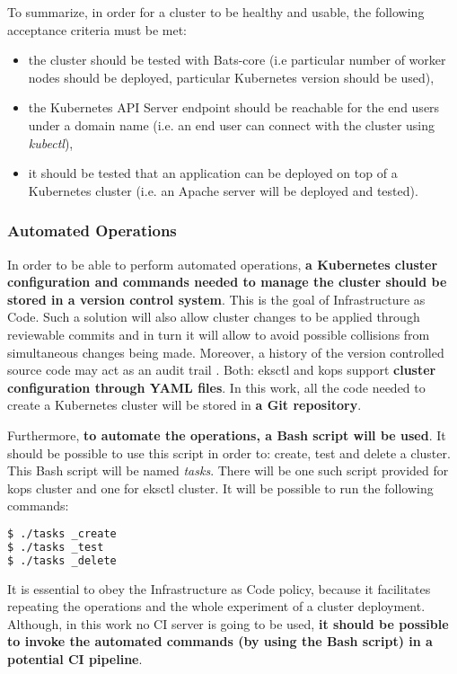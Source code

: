 To summarize, in order for a cluster to be healthy and usable, the following acceptance criteria must be met:
\begin{itemize}
\item the cluster should be tested with Bats-core (i.e particular number of worker nodes should be deployed, particular Kubernetes version should be used),
\item the Kubernetes API Server endpoint should be reachable for the end users under a domain name (i.e. an end user can connect with the cluster using \textit{kubectl}),
\item it should be tested that an application can be deployed on top of a Kubernetes cluster (i.e. an Apache server will be deployed and tested).
\end{itemize}

\subsubsection{Automated Operations}

In order to be able to perform automated operations, \textbf{a Kubernetes cluster configuration and commands needed to manage the cluster should be stored in a version control system}. This is the goal of Infrastructure as Code. Such a solution will also allow cluster changes to be applied through reviewable commits and in turn it will allow to avoid possible collisions from simultaneous changes being made. Moreover, a history of the version controlled source code may act as an audit trail \cite{online-kops-ci} \cite{online-kops-manifest}. Both: eksctl and kops support \textbf{cluster configuration through YAML files}. In this work, all the code needed to create a Kubernetes cluster will be stored in \textbf{a Git repository}.

Furthermore, \textbf{to automate the operations, a Bash script will be used}. It should be possible to use this script in order to: create, test and delete a cluster. This Bash script will be named \textit{tasks}. There will be one such script provided for kops cluster and one for eksctl cluster. It will be possible to run the following commands:
\begin{lstlisting}[basicstyle=\small,caption={Commands provided by tasks file - a Bash script which automates a Kubernetes cluster operations},captionpos=b,language=Bash,xleftmargin=1cm]
$ ./tasks _create
$ ./tasks _test
$ ./tasks _delete
\end{lstlisting}

It is essential to obey the Infrastructure as Code policy, because it facilitates repeating the operations and the whole experiment of a cluster deployment. Although, in this work no CI server is going to be used, \textbf{it should be possible to invoke the automated commands (by using the Bash script) in a potential CI pipeline}.

